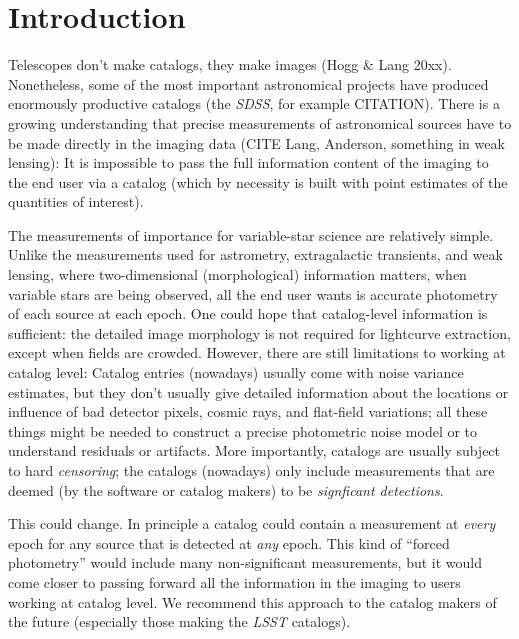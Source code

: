 \documentclass[12pt,preprint]{aastex}
\begin{document}

\section{Introduction}
\label{sec:intro}

Telescopes don't make catalogs, they make images (Hogg \& Lang 20xx).
Nonetheless, some of the most important astronomical projects have produced enormously productive catalogs
(the \textsl{SDSS}, for example CITATION).
There is a growing understanding that precise measurements of astronomical sources have to be made directly in the imaging data
(CITE Lang, Anderson, something in weak lensing):
It is impossible to pass the full information content of the imaging to the end user via a catalog
(which by necessity is built with point estimates of the quantities of interest).

The measurements of importance for variable-star science are relatively simple.
Unlike the measurements used for astrometry, extragalactic transients, and weak lensing,
where two-dimensional (morphological) information matters,
when variable stars are being observed, all the end user wants is accurate photometry of each source at each epoch.
One could hope that catalog-level information is sufficient:
the detailed image morphology is not required for lightcurve extraction, except when fields are crowded.
However, there are still limitations to working at catalog level:
Catalog entries (nowadays) usually come with noise variance estimates,
but they don't usually give detailed information about the locations or influence of
bad detector pixels, cosmic rays, and flat-field variations;
all these things might be needed to construct a precise photometric noise model or to understand residuals or artifacts.
More importantly, catalogs are usually subject to hard \emph{censoring};
the catalogs (nowadays) only include measurements that are deemed (by the software or catalog makers)
to be \emph{signficant detections}.

This could change.
In principle a catalog could contain a measurement at \emph{every} epoch for any source that is detected at \emph{any} epoch.
This kind of ``forced photometry'' would include many non-significant measurements,
but it would come closer to passing forward all the information in the imaging to users working at catalog level.
We recommend this approach to the catalog makers of the future (especially those making the \textsl{LSST} catalogs).
\end{document}
